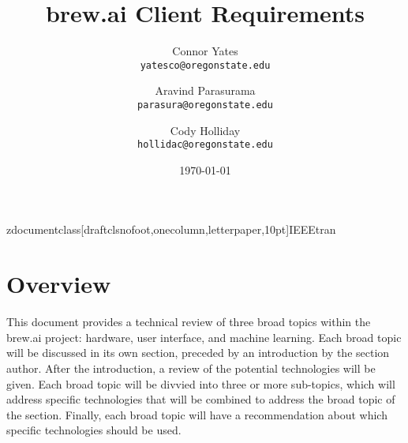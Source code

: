 zdocumentclass[draftclsnofoot,onecolumn,letterpaper,10pt]{IEEEtran}
\pagestyle{empty}
\usepackage{geometry}
\geometry{textheight=9.5in, textwidth=7in}

\newcommand{\subparagraph}{}
\usepackage{titlesec}

\titleformat{\section}[block]{\bfseries\Large}{\thesection}{0.4em}{}
\titleformat{\subsection}[block]{\bfseries\large}{\thesubsection}{0.4em}{}
\titleformat{\subsubsection}[block]{\bfseries\normalsize}{\thesubsubsection}{0.4em}{}
\setlength{\parindent}{0pt}
\renewcommand{\thesection}{\arabic{section}}
\renewcommand{\thesubsection}{\thesection.\arabic{subsection}}
\renewcommand{\thesubsubsection}{\thesubsection.\arabic{subsubsection}}


\author{Connor Yates\\
\texttt{yatesco@oregonstate.edu\\}
\and
Aravind Parasurama\\
\texttt{parasura@oregonstate.edu\\}
\and
Cody Holliday\\
\texttt{hollidac@oregonstate.edu\\}}
\date{\today}
\title{brew.ai Client Requirements}

\maketitle

\newpage
\tableofcontents
\newpage
\section{Overview}
This document provides a technical review of three broad topics within the brew.ai project: hardware, user interface, and machine learning.
Each broad topic will be discussed in its own section, preceded by an introduction by the section author.
After the introduction, a review of the potential technologies will be given.
Each broad topic will be divvied into three or more sub-topics, which will address specific technologies that will be combined to address the broad topic of the section.
Finally, each broad topic will have a recommendation about which specific technologies should be used.

